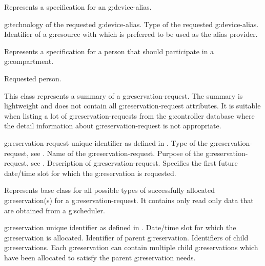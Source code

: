 \begin{Api}
Represents a specification for an \gls{g:device-alias}.
\begin{ApiClassAttributes}
 \Gls{g:technology} of the requested \gls{g:device-alias}.
 Type of the requested \gls{g:device-alias}.
 Identifier of a \gls{g:resource} with  which is preferred to be used as the alias provider.
\end{ApiClassAttributes}

Represents a specification for a person that should participate in a \gls{g:compartment}.
\begin{ApiClassAttributes}
 Requested person.
\end{ApiClassAttributes}

This class represents a summary of a \gls{g:reservation-request}. The summary is lightweight and does not contain all \gls{g:reservation-request} attributes. It is suitable when listing a lot of \glspl{g:reservation-request} from the \gls{g:controller} database where the detail information about \gls{g:reservation-request} is not appropriate.
\begin{ApiClassAttributes}
 \Gls{g:reservation-request} unique identifier as defined in .
 Type of the \gls{g:reservation-request}, see .
 Name of the \gls{g:reservation-request}.
 Purpose of the \gls{g:reservation-request}, see .
 Description of \gls{g:reservation-request}.
 Specifies the first future date/time slot for which the \gls{g:reservation} is requested.
\end{ApiClassAttributes}

Represents base class for all possible types of successfully allocated \gls{g:reservation}(s) for a \gls{g:reservation-request}. It contains only read only data that are obtained from a \gls{g:scheduler}.
\begin{ApiClassAttributes}
 \Gls{g:reservation} unique identifier as defined in .
 Date/time slot for which the \gls{g:reservation} is allocated.
 Identifier of parent \gls{g:reservation}.
 Identifiers of child \glspl{g:reservation}. Each \gls{g:reservation} can contain multiple child \glspl{g:reservation} which have been allocated to satisfy the parent \gls{g:reservation} needs.
\end{ApiClassAttributes}


\end{Api}
